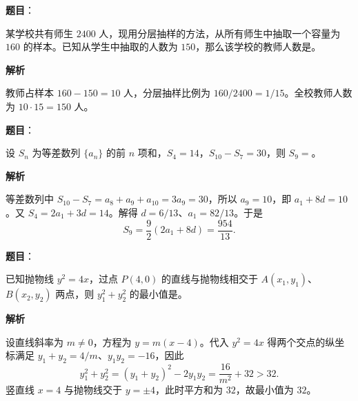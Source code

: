 \begin{answer}

\textbf{题目}：

某学校共有师生 $2400$ 人，现用分层抽样的方法，从所有师生中抽取一个容量为 $160$ 的样本。已知从学生中抽取的人数为 $150$，那么该学校的教师人数是\gkblank{}。

\textbf{解析}

教师占样本 $160-150=10$ 人，分层抽样比例为 $160/2400=1/15$。全校教师人数为 $10\cdot15=150$ 人。


\end{answer}
\begin{answer}

\textbf{题目}：

设 $S_n$ 为等差数列 $\{a_n\}$ 的前 $n$ 项和，$S_4=14$，$S_{10}-S_7=30$，则 $S_9=$\gkblank{}。

\textbf{解析}

等差数列中 $S_{10}-S_7=a_8+a_9+a_{10}=3a_9=30$，所以 $a_9=10$，即 $a_1+8d=10$。又 $S_4=2a_1+3d=14$。解得 $d=6/13$、$a_1=82/13$。于是
\nopagebreak[4]
\[
S_9=\frac92(2a_1+8d)=\frac{954}{13}.
\]


\end{answer}
\begin{answer}

\textbf{题目}：

已知抛物线 $y^2=4x$，过点 $P(4,0)$ 的直线与抛物线相交于 $A(x_1,y_1)$、$B(x_2,y_2)$ 两点，则 $y_1^2+y_2^2$ 的最小值是\gkblank{}。

\textbf{解析}

设直线斜率为 $m\ne0$，方程为 $y=m(x-4)$。代入 $y^2=4x$ 得两个交点的纵坐标满足 $y_1+y_2=4/m$、$y_1y_2=-16$，因此
\nopagebreak[4]
\[
y_1^2+y_2^2=(y_1+y_2)^2-2y_1y_2=\frac{16}{m^2}+32>32.
\]
竖直线 $x=4$ 与抛物线交于 $y=\pm4$，此时平方和为 $32$，故最小值为 $32$。


\end{answer}

